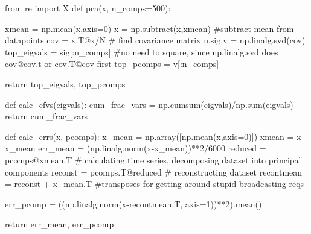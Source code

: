 \documentclass[submit]{harvardml}
\begin{document}
\begin{python}
from re import X
def pca(x, n_comps=500):
    
    xmean = np.mean(x,axis=0)
    x = np.subtract(x,xmean) #subtract mean from datapoints
    cov = x.T@x/N # find covariance matrix
    u,sig,v = np.linalg.svd(cov)
    top_eigvals = sig[:n_comps] #no need to square, since np.linalg.svd does cov@cov.t or cov.T@cov first
    top_pcomps = v[:n_comps] 



    return top_eigvals, top_pcomps


def calc_cfvs(eigvals):
    cum_frac_vars = np.cumsum(eigvals)/np.sum(eigvals)
    return cum_frac_vars


def calc_errs(x, pcomps):
    x_mean = np.array([np.mean(x,axis=0)])
    xmean = x - x_mean
    err_mean = (np.linalg.norm(x-x_mean))**2/6000
    reduced = pcomps@xmean.T # calculating time series, decomposing dataset into principal components
    reconst = pcomps.T@reduced # reconstructing dataset
    recontmean = reconst + x_mean.T #transposes for getting around stupid broadcasting reqs


    err_pcomp = ((np.linalg.norm(x-recontmean.T, axis=1))**2).mean()


    return err_mean, err_pcomp
\end{python}
\end{document}
